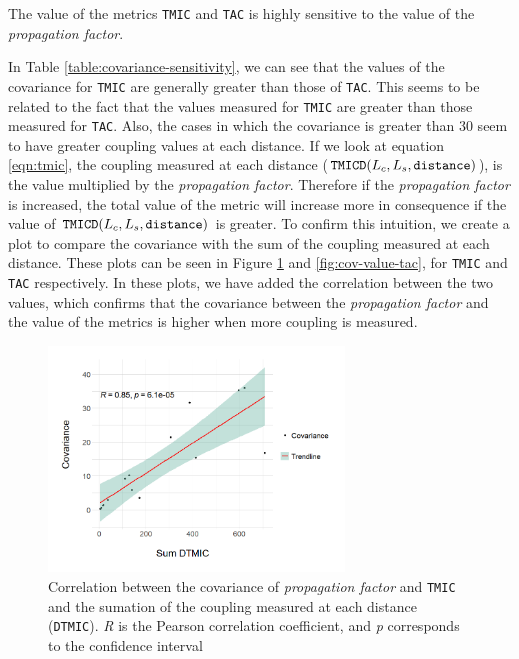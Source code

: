 \begin{finding}
	The value of the metrics \texttt{TMIC} and \texttt{TAC} is highly sensitive to the value of the \textit{propagation factor}.
	\label{find:high-sensitivity}
\end{finding}

In Table \ref{table:covariance-sensitivity}, we can see that the values of the covariance for \texttt{TMIC} are generally greater than those of \texttt{TAC}. This seems to be related to the fact that the values measured for \texttt{TMIC} are greater than those measured for \texttt{TAC}. Also, the cases in which the covariance is greater than $30$ seem to have greater coupling values at each distance. If we look at equation \ref{eqn:tmic}, the coupling measured at each distance ($\verb|TMICD|(L_c,L_s, \verb|distance|)$), is the value multiplied by the \textit{propagation factor}. Therefore if the \textit{propagation factor} is increased, the total value of the metric will increase more in consequence if the value of $\verb|TMICD|(L_c,L_s, \verb|distance|)$ is greater. To confirm this intuition, we create a plot to compare the covariance with the sum of the coupling measured at each distance. These plots can be seen in Figure \ref{fig:cov-value-tmic} and \ref{fig:cov-value-tac}, for \texttt{TMIC} and \texttt{TAC} respectively. In these plots, we have added the correlation between the two values, which confirms that the covariance between the \textit{propagation factor} and the value of the metrics is higher when more coupling is measured.

\begin{figure}[ht!]
\begin{center}
\includegraphics[width=0.7\textwidth]{figures/results/covariance-values-tmic.png}
\caption{Correlation between the covariance of \textit{propagation factor} and \texttt{TMIC} and the sumation of the coupling measured at each distance (\texttt{DTMIC}). \textit{R} is the Pearson correlation coefficient, and \textit{p} corresponds to the confidence interval}
\label{fig:cov-value-tmic}
\end{center}
\end{figure}

